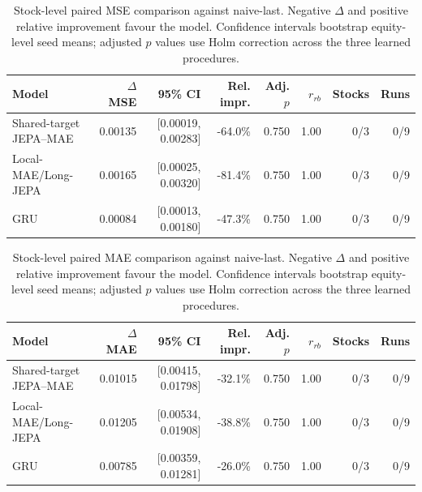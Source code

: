 \begin{table}[t]
\centering
\small
\caption{Stock-level paired MSE comparison against naive-last. Negative $\Delta$ and positive relative improvement favour the model. Confidence intervals bootstrap equity-level seed means; adjusted $p$ values use Holm correction across the three learned procedures.}
\label{tab:paired_mse_naive}
\begin{tabular}{lrrrrrrr}
\toprule
Model & $\Delta$MSE & 95\% CI & Rel. impr. & Adj. $p$ & $r_{rb}$ & Stocks & Runs \\
\midrule
Shared-target JEPA--MAE & 0.00135 & [0.00019, 0.00283] & -64.0\% & 0.750 & 1.00 & 0/3 & 0/9 \\
Local-MAE/Long-JEPA & 0.00165 & [0.00025, 0.00320] & -81.4\% & 0.750 & 1.00 & 0/3 & 0/9 \\
GRU & 0.00084 & [0.00013, 0.00180] & -47.3\% & 0.750 & 1.00 & 0/3 & 0/9 \\
\bottomrule
\end{tabular}
\end{table}

\begin{table}[t]
\centering
\small
\caption{Stock-level paired MAE comparison against naive-last. Negative $\Delta$ and positive relative improvement favour the model. Confidence intervals bootstrap equity-level seed means; adjusted $p$ values use Holm correction across the three learned procedures.}
\label{tab:paired_mae_naive}
\begin{tabular}{lrrrrrrr}
\toprule
Model & $\Delta$MAE & 95\% CI & Rel. impr. & Adj. $p$ & $r_{rb}$ & Stocks & Runs \\
\midrule
Shared-target JEPA--MAE & 0.01015 & [0.00415, 0.01798] & -32.1\% & 0.750 & 1.00 & 0/3 & 0/9 \\
Local-MAE/Long-JEPA & 0.01205 & [0.00534, 0.01908] & -38.8\% & 0.750 & 1.00 & 0/3 & 0/9 \\
GRU & 0.00785 & [0.00359, 0.01281] & -26.0\% & 0.750 & 1.00 & 0/3 & 0/9 \\
\bottomrule
\end{tabular}
\end{table}

